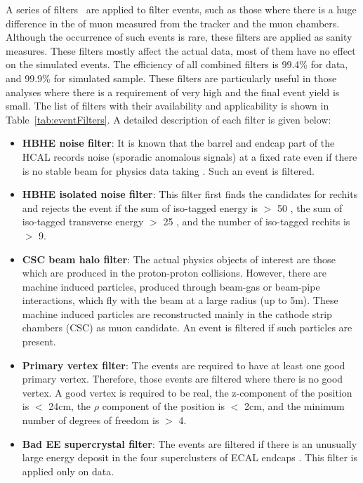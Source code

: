 A series of filters~\cite{metFilters} are applied to
filter  events, such as those where there is a huge difference in the \pt of
muon measured from the tracker and the muon chambers. Although the occurrence of such
 events is rare, these filters are applied as sanity measures. These
filters mostly affect the actual data, most of them have no effect on the simulated
events. The efficiency of all combined filters is 99.4\% for data, and 99.9\%
for simulated \ttjets sample. These filters are particularly useful in those
analyses where there is a requirement of very high \MET and the final event yield is 
small. The list of filters with their availability and applicability is shown
in Table~\ref{tab:eventFilters}. A detailed description of each filter is given below:
\begin{itemize}[leftmargin=*]
	\item \textbf{HBHE noise filter}: It is known that the barrel and endcap
		part of the HCAL records noise (sporadic anomalous signals) at a
		fixed rate even if there is no stable beam for physics data taking
        \cite{metFilters}. Such an event is filtered.
	\item \textbf{HBHE isolated noise filter}: This filter first finds the
		candidates for rechits and rejects the event if the sum of
		iso-tagged energy is $>$ 50 \GeV, the sum of iso-tagged transverse
		energy $>$ 25 \GeV, and the number of iso-tagged rechits is $>$ 9.
 	\item \textbf{CSC beam halo filter}: The actual physics objects of interest
		are those which are produced in the proton-proton collisions. However, there
		are machine induced particles, produced through beam-gas or
		beam-pipe interactions, which fly with the beam at a large radius
		(up to 5\unit{m}). These machine induced particles are reconstructed mainly
		in the cathode strip chambers (CSC) as muon candidate. An event is
		filtered if such particles are present.
	\item \textbf{Primary vertex filter}: The events are required to have
		at least one good primary vertex. Therefore, those events are
		filtered where there is no good vertex. A good vertex is
		required to be real, the z-component of the position is $ <$ 24\unit{cm},
		the $\rho$ component of the position is $<$ 2\unit{cm}, and the minimum
		number of degrees of freedom is $>$ 4.
	\item \textbf{Bad EE supercrystal filter}: The events are filtered if
		there is an unusually large energy deposit in the four superclusters
        of ECAL endcaps \cite{metFilters}. This filter is applied only on data.

\end{itemize}
